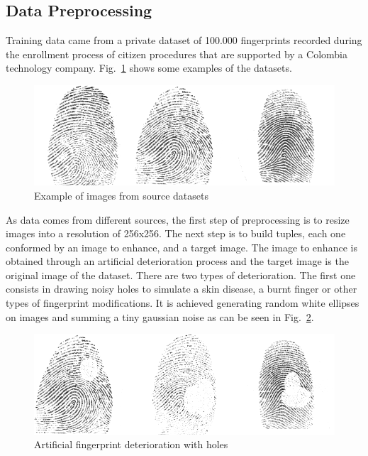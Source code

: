 \documentclass[a4paper,fleqn]{cas-dc}
\begin{document}
\subsection{Data Preprocessing}
\label{sec:DP}

Training data came from a private dataset of 100.000 fingerprints recorded during the enrollment process of citizen procedures that are supported by a Colombia technology company. Fig.~\ref{fig1} shows some examples of the datasets.

\begin{figure}[htbp]
\centerline{\includegraphics[scale=0.3]{figs/dataset_example.png}}
\caption{Example of images from source datasets}
\label{fig1}
\end{figure}

As data comes from different sources, the first step of preprocessing is to resize images into a resolution of 256x256. The next step is to build tuples, each one conformed by an image to enhance, and a target image. The image to enhance is obtained through an artificial deterioration process and the target image is the original image of the dataset. There are two types of deterioration. The first one consists in drawing noisy holes to simulate a skin disease, a burnt finger or other types of fingerprint modifications. It is achieved generating random white ellipses on images and summing a tiny gaussian noise as can be seen in Fig.~\ref{fig2}.

\begin{figure}[htbp]
\centerline{\includegraphics[scale=0.3]{figs/deterioration_1.png}}
\caption{Artificial fingerprint deterioration with holes}
\label{fig2}
\end{figure}
\end{document}
